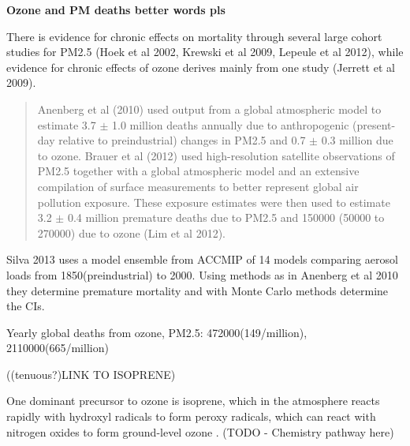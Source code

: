 \textbf{Ozone and PM deaths better words pls}

There is evidence for chronic effects on mortality through several large cohort studies for PM2.5 (Hoek et al 2002, Krewski et al 2009, Lepeule et al 2012), while evidence for chronic effects of ozone derives mainly from one study (Jerrett et al 2009). 

\begin{quote}
Anenberg et al (2010) used output from a global atmospheric model to estimate 3.7 $\pm$ 1.0 million deaths annually due to anthropogenic (present-day relative to preindustrial) changes in PM2.5 and 0.7 $\pm$ 0.3 million due to ozone. Brauer et al (2012) used high-resolution satellite observations of PM2.5 together with a global atmospheric model and an extensive compilation of surface measurements to better represent global air pollution exposure. These exposure estimates were then used to estimate 3.2 $\pm$ 0.4 million premature deaths due to PM2.5 and 150000 (50000 to 270000) due to ozone (Lim et al 2012).
\end{quote} \cite{Silva_2013}

Silva 2013 uses a model ensemble from ACCMIP of 14 models comparing aerosol loads from 1850(preindustrial) to 2000. Using methods as in Anenberg et al 2010 they determine premature mortality and with Monte Carlo methods determine the CIs.

Yearly global deaths from ozone, PM2.5:
472000(149/million), 2110000(665/million) \cite{Silva_2013}

((tenuous?)LINK TO ISOPRENE)

One dominant precursor to ozone is isoprene, which in the atmosphere reacts rapidly with hydroxyl radicals to form peroxy radicals, which can react with nitrogen oxides to form ground-level ozone .
(TODO - Chemistry pathway here)
  